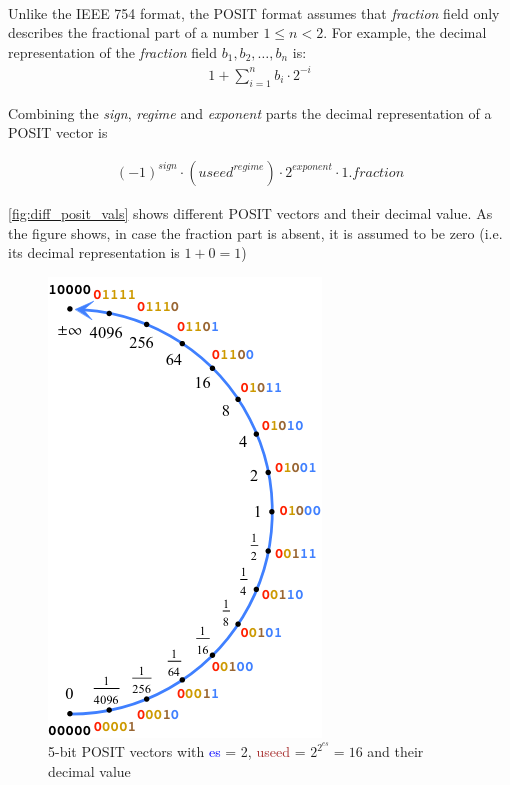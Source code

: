 \documentclass[10pt]{article}
\begin{document}
\paragraph{}
Unlike the IEEE 754 format, the POSIT format assumes that \textit{fraction} field only
describes the fractional part of a number $1\leq n < 2 $. For example, the
decimal representation of the \textit{fraction} field $b_{1},b_{2},\dots,b_{n}$
is:
\begin{align*}
 1 + \sum_{i=1}^{n}b_{i}\cdot 2^{-i}
\end{align*}

Combining the \textit{sign}, \textit{regime} and \textit{exponent} parts the
decimal representation of a POSIT vector is

\begin{align}
  \label{eq:3}
  {(-1)}^{sign} \cdot ({useed}^{regime}) \cdot {2}^{exponent} \cdot 1.fraction
\end{align}


\autoref{fig:diff_posit_vals} shows different POSIT vectors and their decimal
value. As the figure shows, in case the fraction part is absent, it is assumed
to be zero (i.e. its decimal representation is $1 + 0 = 1$)

\begin{figure}[h]
  \centering
  \includegraphics[height=0.25\paperheight]{posit_values}
  \caption{5-bit POSIT vectors with \textcolor{blue}{es} = 2, \textcolor{brown}{useed} = $2^{2^{es}} = 16$ and their
    decimal value}
  \label{fig:diff_posit_vals}
\end{figure}
\end{document}
